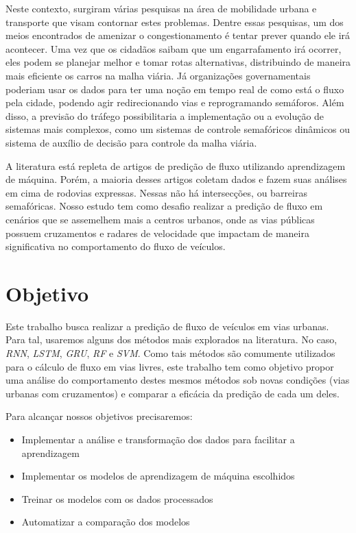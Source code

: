 Neste contexto, surgiram várias pesquisas na área de mobilidade urbana e transporte que visam contornar estes problemas. Dentre essas pesquisas, um dos meios encontrados de amenizar o congestionamento é tentar prever quando ele irá acontecer. Uma vez que os cidadãos saibam que um engarrafamento irá ocorrer, eles podem se planejar melhor e tomar rotas alternativas, distribuindo de maneira mais eficiente os carros na malha viária. Já organizações governamentais poderiam usar os dados para ter uma noção em tempo real de como está o fluxo pela cidade, podendo agir redirecionando vias e reprogramando semáforos. Além disso, a previsão do tráfego possibilitaria a implementação ou a evolução de sistemas mais complexos, como um sistemas de controle semafóricos dinâmicos ou sistema de auxílio de decisão para controle da malha viária.

A literatura está repleta de artigos de predição de fluxo utilizando aprendizagem de máquina. Porém, a maioria desses artigos coletam dados e fazem suas análises em cima de rodovias expressas. Nessas não há intersecções, ou barreiras semafóricas. Nosso estudo tem como desafio realizar a predição de fluxo em cenários que se assemelhem mais a centros urbanos, onde as vias públicas possuem cruzamentos e radares de velocidade que impactam de maneira significativa no comportamento do fluxo de veículos.

\section{Objetivo}

Este trabalho busca realizar a predição de fluxo de veículos em vias urbanas. Para tal, usaremos alguns dos métodos mais explorados na literatura. No caso, \textit{\acrfull{RNN}}, \textit{\acrfull{LSTM}}, \textit{\acrfull{GRU}}, \textit{\acrfull{RF}} e \textit{\acrfull{SVM}}. Como tais métodos são comumente utilizados para o cálculo de fluxo em vias livres, este trabalho tem como objetivo propor uma análise do comportamento destes mesmos métodos sob novas condições (vias urbanas com cruzamentos) e comparar a eficácia da predição de cada um deles.

Para alcançar nossos objetivos precisaremos:

\begin{itemize}
    \item Implementar a análise e transformação dos dados para facilitar a aprendizagem
    \item Implementar os modelos de aprendizagem de máquina escolhidos 
    \item Treinar os modelos com os dados processados
    \item Automatizar a comparação dos modelos
\end{itemize}

